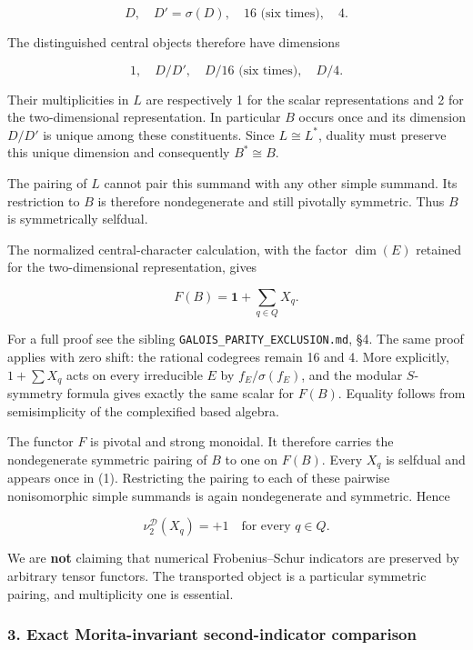 \[
D,\quad D'=\sigma(D),\quad 16\text{ (six times)},\quad4.
\]

The distinguished central objects therefore have dimensions

\[
1,\quad D/D',\quad D/16\text{ (six times)},\quad D/4.
\]

Their multiplicities in \(L\) are respectively 1 for the scalar
representations and 2 for the two-dimensional representation. In
particular \(B\) occurs once and its dimension \(D/D'\) is unique among
these constituents. Since \(L\cong L^*\), duality must preserve this
unique dimension and consequently \(B^*\cong B\).

The pairing of \(L\) cannot pair this summand with any other simple
summand. Its restriction to \(B\) is therefore nondegenerate and still
pivotally symmetric. Thus \(B\) is symmetrically selfdual.

The normalized central-character calculation, with the factor
\(\dim(E)\) retained for the two-dimensional representation, gives

\[
F(B)=\mathbf1+\sum_{q\in Q}X_q.
\tag{1}
\]

For a full proof see the sibling \texttt{GALOIS\_PARITY\_EXCLUSION.md},
§4. The same proof applies with zero shift: the rational codegrees
remain 16 and 4. More explicitly, \(1+\sum X_q\) acts on every
irreducible \(E\) by \(f_E/\sigma(f_E)\), and the modular \(S\)-symmetry
formula gives exactly the same scalar for \(F(B)\). Equality follows
from semisimplicity of the complexified based algebra.

The functor \(F\) is pivotal and strong monoidal. It therefore carries
the nondegenerate symmetric pairing of \(B\) to one on \(F(B)\). Every
\(X_q\) is selfdual and appears once in (1). Restricting the pairing to
each of these pairwise nonisomorphic simple summands is again
nondegenerate and symmetric. Hence

\[
\boxed{\nu_2^{\mathcal D}(X_q)=+1\quad\text{for every }q\in Q.}
\tag{2}
\]

We are \textbf{not} claiming that numerical Frobenius--Schur indicators
are preserved by arbitrary tensor functors. The transported object is a
particular symmetric pairing, and multiplicity one is essential.

\hypertarget{frontier-exact-morita-invariant-second-indicator-comparison}{%
\subsubsection{3. Exact Morita-invariant second-indicator
comparison}\label{frontier-exact-morita-invariant-second-indicator-comparison}}

